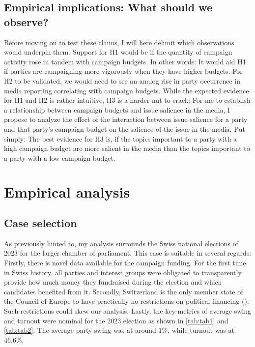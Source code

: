 \documentclass[11pt,a4paper]{article}
\begin{document}
\subsection{Empirical implications: What should we observe?}
Before moving on to test these claims, I will here delimit which observations would underpin them. Support for H1 would be if the quantity of campaign activity rose in tandem with campaign budgets. In other words: It would aid H1 if parties are campaigning more vigorously when they have higher budgets. For H2 to be validated, we would need to see an analog rise in party occurrence in media reporting correlating with campaign budgets. While the expected evidence for H1 and H2 is rather intuitive, H3 is a harder nut to crack: For me to establish a relationship between campaign budgets and issue salience in the media, I propose to analyze the effect of the interaction between issue salience for a party and that party’s campaign budget on the salience of the issue in the media. Put simply: The best evidence for H3 is, if the topics important to a party with a high campaign budget are more salient in the media than the topics important to a party with a low campaign budget.


\section{Empirical analysis}

\subsection{Case selection}
As previously hinted to, my analysis surrounds the Swiss national elections of 2023 for the larger chamber of parliament. This case is suitable in several regards: Firstly, there is novel data available for the campaign funding. For the first time in Swiss history, all parties and interest groups were obligated to transparently provide how much money they fundraised during the election and which candidates benefited from it. Secondly, Switzerland is the only member state of the Council of Europe to have practically no restrictions on political financing (\cite{jaberg_largent_2019}): Such restrictions could skew our analysis. Lastly, the key-metrics of average swing and turnout were nominal for the 2023 election as shown in \autoref{tab:tab1} and \autoref{tab:tab2}: The average party-swing was at around 1\%, while turnout was at 46.6\%.
\end{document}
